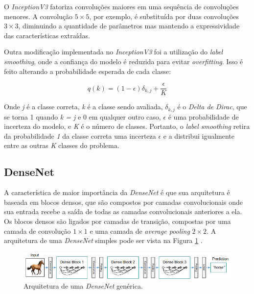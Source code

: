 O \textit{InceptionV3}\cite{inceptionv3} fatoriza convoluções maiores em uma sequência de convoluções menores. A convolução $5 \times 5$, por exemplo, é substituída por duas convoluções $3 \times 3$, diminuindo a quantidade de parâmetros mas mantendo a expressividade das características extraídas.

Outra modificação implementada no \textit{InceptionV3} foi a utilização do \textit{label smoothing}, onde a confiança do modelo é reduzida para evitar \textit{overfitting}. Isso é feito alterando a probabilidade esperada de cada classe:

\begin{equation}
    \label{eqn:labelsmoothing}
     q(k) = (1-\epsilon )\delta _{k,j}+\frac{\epsilon }{K}
\end{equation}

Onde \textit{j} é a classe correta, \textit{k} é a classe sendo avaliada, $\delta_{k,j}$ é o \textit{Delta de Dirac}, que se torna 1 quando \textit{k = j} e 0 em qualquer outro caso, $\epsilon$ é uma probabilidade de incerteza do modelo, e \textit{K} é o número de classes. Portanto, o \textit{label smoothing} retira da probabilidade \textit{1} da classe correta uma incerteza $\epsilon$ e a distribui igualmente entre as outras \textit{K} classes do problema.
\subsection{DenseNet}

A característica de maior importância da \textit{DenseNet}\cite{densenet} é que sua arquitetura é baseada em blocos densos, 
que são compostos por camadas convolucionais onde sua entrada recebe a saída de todas as camadas convolucionais anteriores a ela. 
Os blocos densos são ligados por camadas de transição, compostas por uma camada de convolução $1 \times 1$ e uma camada de \textit{average pooling} $2 \times 2$. 
A arquitetura de uma \textit{DenseNet} simples pode ser vista na Figura \ref{fig:densenet_arch} \cite{densenet}.

\begin{figure}[htb]
\centerline{\includegraphics[width=1\linewidth]{images/densenet.png}}
\caption{Arquitetura de uma \textit{DenseNet} genérica\cite{densenet}.}
\label{fig:densenet_arch}
\end{figure}

